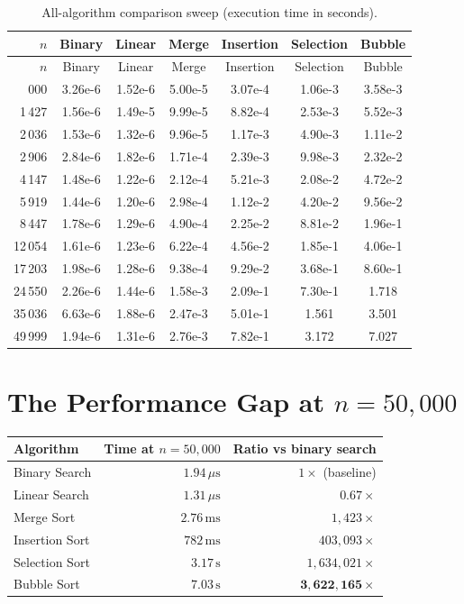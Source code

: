 \documentclass[12pt,a4paper]{report}
\begin{document}
\begin{longtable}{rSSSSSS}
\caption{All-algorithm comparison sweep (execution time in seconds).}
\label{tab:compare}\\
\toprule
$n$ & {Binary} & {Linear} & {Merge} & {Insertion} & {Selection} & {Bubble} \\
\midrule
\endfirsthead
\toprule
$n$ & {Binary} & {Linear} & {Merge} & {Insertion} & {Selection} & {Bubble} \\
\midrule
\endhead
\bottomrule
{}\,000 & 3.26e-6 & 1.52e-6 & 5.00e-5 & 3.07e-4 & 1.06e-3 & 3.58e-3 \\
  1\,427 & 1.56e-6 & 1.49e-5 & 9.99e-5 & 8.82e-4 & 2.53e-3 & 5.52e-3 \\
  2\,036 & 1.53e-6 & 1.32e-6 & 9.96e-5 & 1.17e-3 & 4.90e-3 & 1.11e-2 \\
  2\,906 & 2.84e-6 & 1.82e-6 & 1.71e-4 & 2.39e-3 & 9.98e-3 & 2.32e-2 \\
  4\,147 & 1.48e-6 & 1.22e-6 & 2.12e-4 & 5.21e-3 & 2.08e-2 & 4.72e-2 \\
  5\,919 & 1.44e-6 & 1.20e-6 & 2.98e-4 & 1.12e-2 & 4.20e-2 & 9.56e-2 \\
  8\,447 & 1.78e-6 & 1.29e-6 & 4.90e-4 & 2.25e-2 & 8.81e-2 & 1.96e-1 \\
 12\,054 & 1.61e-6 & 1.23e-6 & 6.22e-4 & 4.56e-2 & 1.85e-1 & 4.06e-1 \\
 17\,203 & 1.98e-6 & 1.28e-6 & 9.38e-4 & 9.29e-2 & 3.68e-1 & 8.60e-1 \\
 24\,550 & 2.26e-6 & 1.44e-6 & 1.58e-3 & 2.09e-1 & 7.30e-1 & 1.718   \\
 35\,036 & 6.63e-6 & 1.88e-6 & 2.47e-3 & 5.01e-1 & 1.561   & 3.501   \\
 49\,999 & 1.94e-6 & 1.31e-6 & 2.76e-3 & 7.82e-1 & 3.172   & 7.027   \\
\end{longtable}

\section{The Performance Gap at $n = 50{,}000$}

\begin{center}
\begin{tabular}{lrr}
\toprule
\textbf{Algorithm} & \textbf{Time at $n=50{,}000$} & \textbf{Ratio vs binary search} \\
\midrule
Binary Search  & $1.94\,\mu\text{s}$  & $1\times$ (baseline) \\
Linear Search  & $1.31\,\mu\text{s}$  & $0.67\times$ \\
Merge Sort     & $2.76\,\text{ms}$    & $1{,}423\times$ \\
Insertion Sort & $782\,\text{ms}$     & $403{,}093\times$ \\
Selection Sort & $3.17\,\text{s}$     & $1{,}634{,}021\times$ \\
Bubble Sort    & $7.03\,\text{s}$     & $\mathbf{3{,}622{,}165\times}$ \\
\bottomrule
\end{tabular}
\end{center}
\end{document}
